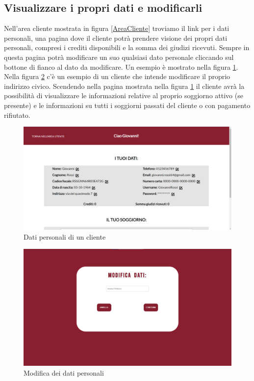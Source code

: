 \documentclass [a4paper, 12pt]{book}
\begin{document}
\subsection{Visualizzare i propri dati e modificarli}
Nell'area cliente mostrata in figura \ref{AreaCliente} troviamo il link per i dati personali, una pagina dove il cliente potrà prendere visione dei propri dati personali, compresi i crediti disponibili e la somma dei giudizi ricevuti. Sempre in questa pagina potrà modificare un suo qualsiasi dato personale cliccando sul bottone di fianco al dato da modificare. Un esempio è mostrato nella figura \ref{DatiPersonali}. Nella figura \ref{ModificaDatiPersonali} c'è un esempio di un cliente che intende modificare il proprio indirizzo civico. Scendendo nella pagina mostrata nella figura \ref{DatiPersonali} il cliente avrà la possibilità di visualizzare le informazioni relative al proprio soggiorno attivo (se presente) e le informazioni su tutti i soggiorni passati del cliente o con pagamento rifiutato.
\begin{figure}[!h]
\centering
\includegraphics[scale=0.3]{DatiPersonali.png}
\caption{Dati personali di un cliente}
\label{DatiPersonali}
\end{figure}

\begin{figure}[!h]
\centering
\includegraphics[scale=0.3]{ModificaDatiPersonali.png}
\caption{Modifica dei dati personali}
\label{ModificaDatiPersonali}
\end{figure}
\end{document}
